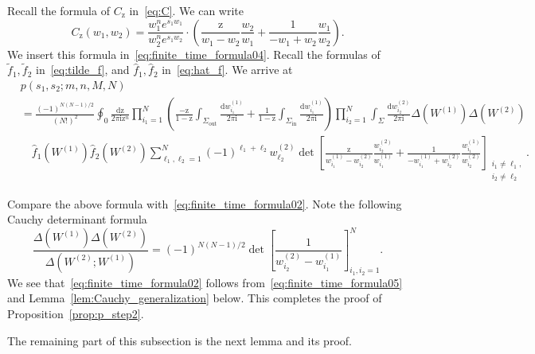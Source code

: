 \documentclass{article}
\numberwithin{equation}{section}
\newcommand{\ddbar}[2]{\frac{{\mathrm d}#1}{2\pi {\mathrm i}#2}}
\newcommand{\inn}{\mathrm{in}}
\newcommand{\out}{\mathrm{out}}
\newcommand{\rz}{\mathrm{z}}
\begin{document}
Recall the formula of $C_\rz$ in~\eqref{eq:C}. We can write
\begin{equation*}
	C_\rz(w_1,w_2)= \frac{w_1^ne^{s_1w_1}}{w_2^ne^{s_1w_2}} 
	                \cdot
	                \left(
	                \frac{\rz}{w_1-w_2}\frac{w_2}{w_1} 
	                +
	                \frac{1}{-w_1+w_2}\frac{w_1}{w_2}
	                \right).
\end{equation*}
We insert this formula in~\eqref{eq:finite_time_formula04}. Recall the formulas of $\tilde f_1, \tilde f_2$ in~\eqref{eq:tilde_f}, and $\hat f_1, \hat f_2$ in~\eqref{eq:hat_f}. We arrive at
	\begin{equation}
	\label{eq:finite_time_formula05}
	\begin{split}
		& p(s_1,s_2;m,n,M,N) \\
		& = \frac{(-1)^{N(N-1)/2}}
		{(N!)^2}
		\oint_0\ddbar{\rz}{\rz^{n}}
		\prod_{i_1=1}^N \left( \frac{-\rz}{1-\rz} \int_{\Sigma_{\out}}
		\ddbar{w_{i_1}^{(1)}}{}
		+\frac{1}{1-\rz}  \int_{\Sigma_{\inn}}
		\ddbar{w_{i_1}^{(1)}}{}
		\right)
		\prod_{i_2=1}^N \int_{\Sigma} \ddbar{w_{i_2}^{(2)}}{}\Delta\left(W^{(1)}\right)
		\Delta\left(W^{(2)}\right)
		\\
		&		
		\quad		
		\hat f_1\left( W^{(1)} \right)
		\hat f_2\left( W^{(2)} \right)
		\sum_{\ell_1,\ell_2=1}^N (-1)^{\ell_1+\ell_2}
		w_{\ell_2}^{(2)}
		\det\left[
		\frac{\rz}{w_{i_1}^{(1)}-w_{i_2}^{(2)}}\frac{w_{i_2}^{(2)}}{w_{i_1}^{(1)}} 
		+
		\frac{1}{-w_{i_1}^{(1)}+w_{i_2}^{(2)}}\frac{w_{i_1}^{(1)}}{w_{i_2}^{(2)}}
		\right]_{\substack{i_1\ne \ell_1,\\
				i_2\ne \ell_2}
		}.
	\end{split}   
\end{equation}

Compare the above formula with~\eqref{eq:finite_time_formula02}. Note the following Cauchy determinant formula
\begin{equation*}
	\frac{\Delta\left(W^{(1)}\right)
		\Delta\left(W^{(2)}\right)}
	     {\Delta\left(W^{(2)};W^{(1)}\right)}
	     =(-1)^{N(N-1)/2} \det\left[\frac{1}{w_{i_2}^{(2)} -w_{i_1}^{(1)}}\right]_{i_1,i_2=1}^N.
\end{equation*}
We see that~\eqref{eq:finite_time_formula02} follows from~\eqref{eq:finite_time_formula05} and Lemma~\ref{lem:Cauchy_generalization} below. This completes the proof of Proposition~\ref{prop:p_step2}.

The remaining part of this subsection is the next lemma and its proof.
\end{document}
